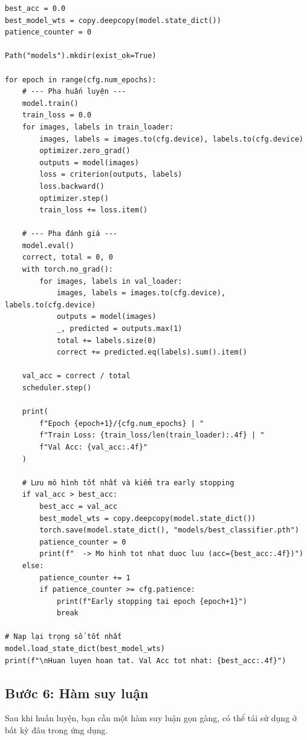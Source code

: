 \begin{verbatim}
best_acc = 0.0
best_model_wts = copy.deepcopy(model.state_dict())
patience_counter = 0

Path("models").mkdir(exist_ok=True)

for epoch in range(cfg.num_epochs):
    # --- Pha huấn luyện ---
    model.train()
    train_loss = 0.0
    for images, labels in train_loader:
        images, labels = images.to(cfg.device), labels.to(cfg.device)
        optimizer.zero_grad()
        outputs = model(images)
        loss = criterion(outputs, labels)
        loss.backward()
        optimizer.step()
        train_loss += loss.item()

    # --- Pha đánh giá ---
    model.eval()
    correct, total = 0, 0
    with torch.no_grad():
        for images, labels in val_loader:
            images, labels = images.to(cfg.device), labels.to(cfg.device)
            outputs = model(images)
            _, predicted = outputs.max(1)
            total += labels.size(0)
            correct += predicted.eq(labels).sum().item()

    val_acc = correct / total
    scheduler.step()

    print(
        f"Epoch {epoch+1}/{cfg.num_epochs} | "
        f"Train Loss: {train_loss/len(train_loader):.4f} | "
        f"Val Acc: {val_acc:.4f}"
    )

    # Lưu mô hình tốt nhất và kiểm tra early stopping
    if val_acc > best_acc:
        best_acc = val_acc
        best_model_wts = copy.deepcopy(model.state_dict())
        torch.save(model.state_dict(), "models/best_classifier.pth")
        patience_counter = 0
        print(f"  -> Mo hinh tot nhat duoc luu (acc={best_acc:.4f})")
    else:
        patience_counter += 1
        if patience_counter >= cfg.patience:
            print(f"Early stopping tai epoch {epoch+1}")
            break

# Nạp lại trọng số tốt nhất
model.load_state_dict(best_model_wts)
print(f"\nHuan luyen hoan tat. Val Acc tot nhat: {best_acc:.4f}")
\end{verbatim}

\subsection{Bước 6: Hàm suy luận}
\label{subsec:cls_inference}

Sau khi huấn luyện, bạn cần một hàm suy luận gọn gàng, có thể tái sử dụng ở bất kỳ đâu trong ứng dụng.

